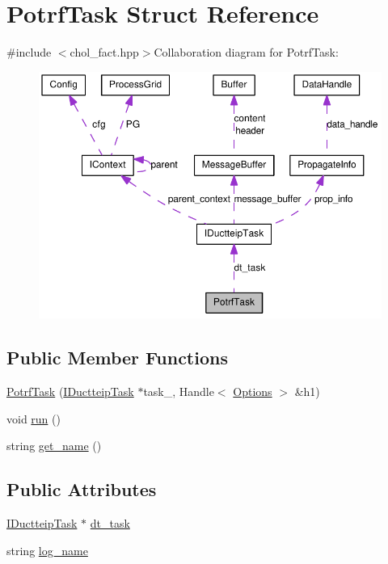 \hypertarget{struct_potrf_task}{
\section{PotrfTask Struct Reference}
\label{struct_potrf_task}
}


{\ttfamily \#include $<$chol\_\-fact.hpp$>$}Collaboration diagram for PotrfTask:\nopagebreak
\begin{figure}[H]
\begin{center}
\leavevmode
\includegraphics[width=394pt]{struct_potrf_task__coll__graph}
\end{center}
\end{figure}
\subsection*{Public Member Functions}
\begin{DoxyCompactItemize}
\item 
\hyperlink{struct_potrf_task_a91fdd6aa7f492dad620f3c10addf5c06}{PotrfTask} (\hyperlink{class_i_ductteip_task}{IDuctteipTask} $\ast$task\_\-, Handle$<$ \hyperlink{struct_options}{Options} $>$ \&h1)
\item 
void \hyperlink{struct_potrf_task_a03b693541e273a0980b61307638f6728}{run} ()
\item 
string \hyperlink{struct_potrf_task_a943b08be82bb47d4b1deaa381c7aafcc}{get\_\-name} ()
\end{DoxyCompactItemize}
\subsection*{Public Attributes}
\begin{DoxyCompactItemize}
\item 
\hyperlink{class_i_ductteip_task}{IDuctteipTask} $\ast$ \hyperlink{struct_potrf_task_a65ff75f51dd2d75b0954dd9e4f1ad807}{dt\_\-task}
\item 
string \hyperlink{struct_potrf_task_abbf9bea396bbc54ba1fcc951d63b5a09}{log\_\-name}
\end{DoxyCompactItemize}



